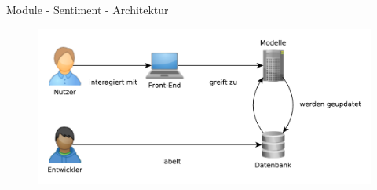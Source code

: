 
\begin{frame}{Module - Sentiment - Architektur}

\begin{figure}[p]
\centering
\includegraphics[scale=0.5]{../img/sentiment-architektur.pdf}
\end{figure}
\end{frame}


% 
% 
% 
% 
% 
